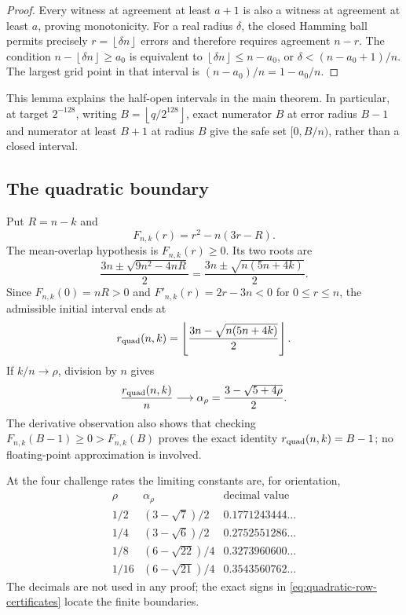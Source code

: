 \documentclass[11pt,a4paper]{amsart}
\numberwithin{equation}{section}
\theoremstyle{remark}
\newcommand{\floor}[1]{\left\lfloor #1\right\rfloor}
\begin{document}
\begin{proof}
Every witness at agreement at least \(a+1\) is also a witness at
agreement at least \(a\), proving monotonicity.  For a real radius
\(\delta\), the closed Hamming ball permits precisely
\(r=\floor{\delta n}\) errors and therefore requires agreement
\(n-r\).  The condition \(n-\floor{\delta n}\ge a_0\) is equivalent to
\(\floor{\delta n}\le n-a_0\), or
\(\delta<(n-a_0+1)/n\).  The largest grid point in that interval is
\((n-a_0)/n=1-a_0/n\).
\end{proof}

This lemma explains the half-open intervals in the main theorem.  In
particular, at target \(2^{-128}\), writing
\(B=\floor{q/2^{128}}\), exact numerator \(B\) at error radius \(B-1\)
and numerator at least \(B+1\) at radius \(B\) give the safe set
\([0,B/n)\), rather than a closed interval.

\subsection{The quadratic boundary}

Put \(R=n-k\) and
\[
                  F_{n,k}(r)=r^2-n(3r-R).
\]
The mean-overlap hypothesis is \(F_{n,k}(r)\ge0\).  Its two roots are
\[
       \frac{3n\pm\sqrt{9n^2-4nR}}2
       =\frac{3n\pm\sqrt{n(5n+4k)}}2.
\]
Since \(F_{n,k}(0)=nR>0\) and
\(F'_{n,k}(r)=2r-3n<0\) for \(0\le r\le n\), the admissible initial
interval ends at
\[
 r_{\rm quad}(n,k)=
 \floor{\frac{3n-\sqrt{n(5n+4k)}}2}.
\]
If \(k/n\to\rho\), division by \(n\) gives
\[
 \frac{r_{\rm quad}(n,k)}n
 \longrightarrow
 \alpha_\rho=\frac{3-\sqrt{5+4\rho}}2.
\]
The derivative observation also shows that checking
\(F_{n,k}(B-1)\ge0>F_{n,k}(B)\) proves the exact identity
\(r_{\rm quad}(n,k)=B-1\); no floating-point approximation is involved.

At the four challenge rates the limiting constants are, for orientation,
\[
\begin{array}{c|c|c}
 \rho&\alpha_\rho&\text{decimal value}\\ \hline
 1/2&(3-\sqrt7)/2&0.1771243444\ldots\\
 1/4&(3-\sqrt6)/2&0.2752551286\ldots\\
 1/8&(6-\sqrt{22})/4&0.3273960600\ldots\\
 1/16&(6-\sqrt{21})/4&0.3543560762\ldots
\end{array}
\]
The decimals are not used in any proof; the exact signs in
\eqref{eq:quadratic-row-certificates} locate the finite boundaries.
\end{document}
